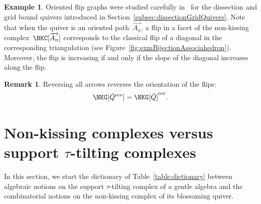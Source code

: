 \documentclass{memo-l}
\theoremstyle{definition}
\newtheorem{example}[theorem]{Example}
\newtheorem{remark}[theorem]{Remark}
\newcommand{\ssm}{\smallsetminus} %
\newcommand{\eqdef}{\mbox{\,\raisebox{0.2ex}{\scriptsize\ensuremath{\mathrm:}}\ensuremath{=}\,}} %
\newcommand{\fref}[1]{Figure~\ref{#1}} %
\DeclareRobustCommand{\exmAn}{\overrightarrow{A_n}} %
\newcommand{\vincent}[1]{\todo[color=blue!30]{#1 \\ \hfill --- V.}}
\newcommand{\blossom}{^\text{\ding{96}}} %
\newcommand{\reversed}[1]{#1^{\mathrm{rev}}} %
\begin{document}
\begin{example}
Oriented flip graphs were studied carefully in~\cite{GarverMcConville, MannevillePilaud-accordion, McConville} for the dissection and grid bound quivers introduced in Section~\ref{subsec:dissectionGridQuivers}.
Note that when the quiver is an oriented path~$\exmAn$, a flip in a facet of the non-kissing complex~$\NKC[\exmAn]$ corresponds to the classical flip of a diagonal in the corresponding triangulation (see \fref{fig:exmBijectionAssociahedron}).
Moreover, the flip is increasing if and only if the slope of the diagonal increases along the flip.
\end{example}

\begin{remark}
\label{rem:reverseFlipGraph}
Reversing all arrows reverses the orientation of the flips: \[\NKG[\reversed{\bar Q}] = \reversed{\NKG[\bar Q]}.\]
\end{remark}

%
%


\section{Non-kissing complexes versus support $\tau$-tilting complexes}
\label{sec:nkcvsttc}

In this section, we start the dictionary of Table~\ref{table:dictionary} between algebraic notions on the support $\tau$-tilting complex of a gentle algebra and the combinatorial notions on the non-kissing complex of its blossoming quiver.
\end{document}
